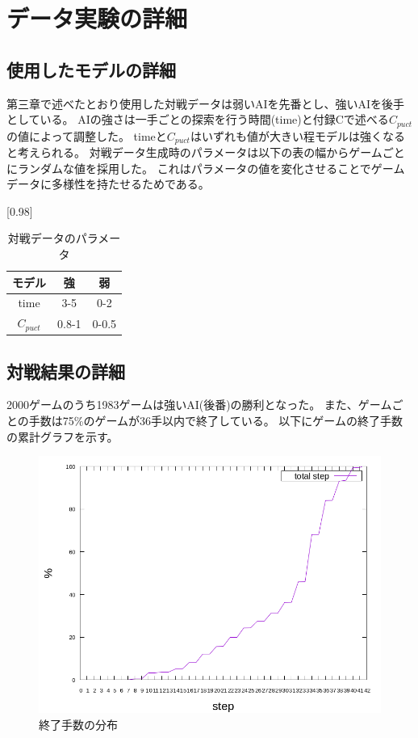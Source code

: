 \chapter{データ実験の詳細}
\section{使用したモデルの詳細}
第三章で述べたとおり使用した対戦データは弱いAIを先番とし、強いAIを後手としている。
AIの強さは一手ごとの探索を行う時間(time)と付録Cで述べる$C_{puct}$の値によって調整した。
timeと$C_{puct}$はいずれも値が大きい程モデルは強くなると考えられる。
対戦データ生成時のパラメータは以下の表の幅からゲームごとにランダムな値を採用した。
これはパラメータの値を変化させることでゲームデータに多様性を持たせるためである。
\begin{table}[H]
	\caption{対戦データのパラメータ}
	\centering
	\scalebox{0.98}[0.98]{
		\begin{tabular}{c|c|c}
			モデル&強&弱\\ \hline
			time    & 3-5 & 0-2 \\ 
			$C_{puct}$ & 0.8-1   & 0-0.5 \\

		\end{tabular}
	}
	\label{table:battle}
\end{table}

\section{対戦結果の詳細}
2000ゲームのうち1983ゲームは強いAI(後番)の勝利となった。
また、ゲームごとの手数は75\%のゲームが36手以内で終了している。
以下にゲームの終了手数の累計グラフを示す。
\begin{figure}[t]
	\centering
	\includegraphics[width=\linewidth]{./figure/stepCum.png}
	\caption{終了手数の分布}
	\label{fig:stepCum}
\end{figure}
